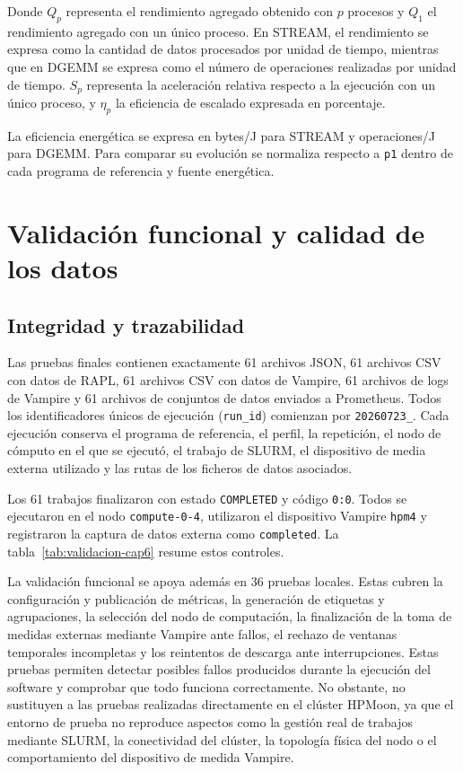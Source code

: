 Donde \(Q_p\) representa el rendimiento agregado obtenido con \(p\) procesos y
\(Q_1\) el rendimiento agregado con un único proceso. En STREAM, el rendimiento
se expresa como la cantidad de datos procesados por unidad de tiempo, mientras
que en DGEMM se expresa como el número de operaciones realizadas por unidad de
tiempo. \(S_p\) representa la aceleración relativa respecto a la ejecución con
un único proceso, y \(\eta_p\) la eficiencia de escalado expresada en porcentaje.

La eficiencia energética se expresa en bytes/J para STREAM y operaciones/J para DGEMM. Para comparar su evolución se normaliza respecto a \texttt{p1} dentro de cada programa de referencia y fuente energética.

\section{Validación funcional y calidad de los datos}
\label{sec:calidad-cap6}

\subsection{Integridad y trazabilidad}

Las pruebas finales contienen exactamente 61 archivos JSON, 61 archivos CSV con datos de RAPL, 61 archivos CSV con datos de Vampire, 61 archivos de logs de Vampire y 61 archivos de conjuntos de datos enviados a Prometheus. Todos los identificadores únicos de ejecución (\texttt{run\_id}) comienzan por \texttt{20260723\_}. Cada ejecución conserva el programa de referencia, el perfil, la repetición, el nodo de cómputo en el que se ejecutó, el trabajo de SLURM, el dispositivo de media externa utilizado y las rutas de los ficheros de datos asociados.

Los 61 trabajos finalizaron con estado \texttt{COMPLETED} y código \texttt{0:0}. Todos se ejecutaron en el nodo \texttt{compute-0-4}, utilizaron el dispositivo Vampire \texttt{hpm4} y registraron la captura de datos externa como \texttt{completed}. La tabla~\ref{tab:validacion-cap6} resume estos controles.

La validación funcional se apoya además en 36 pruebas locales. Estas cubren la configuración y publicación de métricas, la generación de etiquetas y agrupaciones, la selección del nodo de computación, la finalización de la toma de medidas externas mediante Vampire ante fallos, el rechazo de ventanas temporales incompletas y los reintentos de descarga ante interrupciones. Estas pruebas permiten detectar posibles fallos producidos durante la ejecución del software y comprobar que todo funciona correctamente. No obstante, no sustituyen a las pruebas realizadas directamente en el clúster HPMoon, ya que el entorno de prueba no reproduce aspectos como la gestión real de trabajos mediante SLURM, la conectividad del clúster, la topología física del nodo o el comportamiento del dispositivo de medida Vampire.

